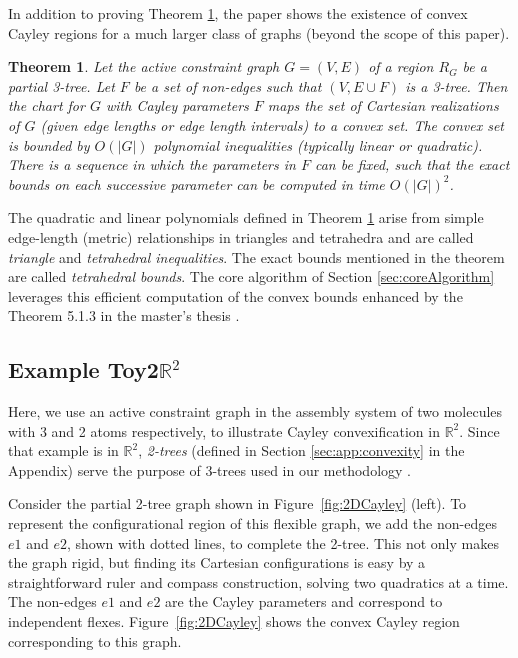 \documentclass[]{article}
\newtheorem{theorem}{Theorem}[section]
\newcommand{\figref}[1]{Figure~\ref{#1}}
\newcommand{\toytwodtwo}{Toy2$\mathbb{R}^2$}
\begin{document}
In addition to proving Theorem \ref{thm:SiGa}, the paper \cite{SiGa:2010} shows
the existence of convex Cayley regions for a much larger class of
graphs (beyond the scope of this paper).

\begin{theorem}\label{thm:SiGa} 
Let the active constraint graph $G = (V, E)$  of a region $R_G$ be a partial
3-tree. Let $F$ be a set of non-edges such that $(V, E\cup F)$ is a 3-tree.
Then the chart for $G$ with Cayley parameters $F$ 
maps the set of Cartesian realizations of $G$ (given edge lengths or edge length intervals) to a convex set.
The convex set is bounded by $O(|G|)$ polynomial inequalities (typically linear or quadratic). 
There is a sequence in which the parameters in $F$ can be fixed, such that the exact bounds on each successive parameter can
be computed in time $O(|G|)^2$.
\end{theorem}

The quadratic and linear polynomials defined in Theorem \ref{thm:SiGa} arise from
simple edge-length (metric) relationships in triangles and tetrahedra
and are called \emph{triangle} and \emph{tetrahedral inequalities}. The exact bounds
mentioned in the theorem are called \emph{tetrahedral bounds}. The core algorithm 
of Section \ref{sec:coreAlgorithm} leverages
this efficient computation of the convex bounds enhanced by the Theorem 5.1.3
in the master's thesis \cite{ugandhar}. 

\subsection{Example \toytwodtwo}
\label{sec:app:toytwodC}
Here, we use an active constraint graph in the assembly system of two molecules
with 3 and 2 atoms respectively, to illustrate Cayley convexification in
$\mathbb{R}^2$. Since that example is in $\mathbb{R}^2$, \emph{2-trees}
(defined in Section \ref{sec:app:convexity} in the Appendix) serve the purpose
of 3-trees used in our methodology \cite{SiGa:2010}.

Consider the partial 2-tree graph shown in \figref{fig:2DCayley} (left). To
represent the configurational region of this flexible graph, we add the
non-edges $e1$ and $e2$, shown with dotted lines, to complete the 2-tree. This
not only makes the graph rigid, but finding its Cartesian configurations is easy by a
straightforward ruler and compass construction, solving two quadratics at a
time. The non-edges $e1$ and $e2$ are the Cayley parameters and correspond to
independent flexes. \figref{fig:2DCayley} shows the convex Cayley
region corresponding to this graph. 
\end{document}

